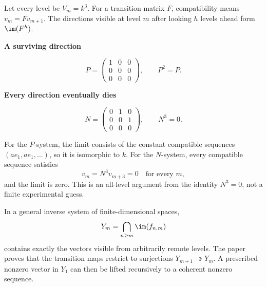 
Let every level be $V_m=k^3$. For a transition matrix $F$, compatibility means $v_m=Fv_{m+1}$. The directions visible at level $m$ after looking $h$ levels ahead form $\im(F^h)$.

\begin{minipage}[t]{.48\linewidth}\centering
{\sffamily\bfseries A surviving direction}\par
\[
P=\begin{pmatrix}1&0&0\\0&0&0\\0&0&0\end{pmatrix},\qquad P^2=P.
\]
\end{minipage}\hfill
\begin{minipage}[t]{.48\linewidth}\centering
{\sffamily\bfseries Every direction eventually dies}\par
\[
N=\begin{pmatrix}0&1&0\\0&0&1\\0&0&0\end{pmatrix},\qquad N^3=0.
\]
\end{minipage}

For the $P$-system, the limit consists of the constant compatible sequences $(a e_1,a e_1,\ldots)$, so it is isomorphic to $k$. For the $N$-system, every compatible sequence satisfies
\[
v_m=N^3v_{m+3}=0\quad\text{for every }m,
\]
and the limit is zero. This is an all-level argument from the identity $N^3=0$, not a finite experimental guess.

In a general inverse system of finite-dimensional spaces,
\[
Y_m=\bigcap_{n\ge m}\im(f_{n,m})
\]
contains exactly the vectors visible from arbitrarily remote levels. The paper proves that the transition maps restrict to surjections $Y_{m+1}\twoheadrightarrow Y_m$. A prescribed nonzero vector in $Y_1$ can then be lifted recursively to a coherent nonzero sequence.


